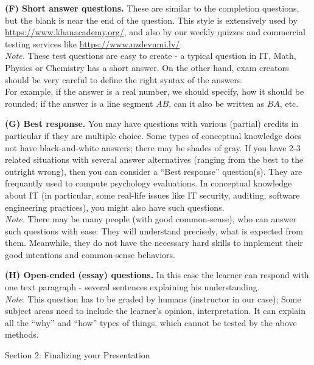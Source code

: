 \documentclass[jou]{apa6}
\begin{document}
\vspace{6pt}
{\bf (F) Short answer questions.} These are similar to the completion questions, but the blank is near
the end of the question. This style is extensively used by \url{https://www.khanacademy.org/}, and also 
by our weekly quizzes and commercial testing services like \url{https://www.uzdevumi.lv/}.\\
{\em Note.} These test questions are easy to create - a typical question in IT, Math, Physics or Chemistry has
a short answer. On the other hand, exam creators should be very careful to define the right syntax of the answers.\\
For example, if the answer is a real number, we should specify, how it should be rounded; 
if the answer is a line segment $AB$, can it also be written as $BA$, etc.


\vspace{6pt}
{\bf (G) Best response.} You may have questions with various (partial) credits \textendash{} in particular
if they are multiple choice. 
Some types of conceptual knowledge does not have black-and-white answers; there may be shades of gray. 
If you have 2-3 related situations with several answer alternatives (ranging from the best to the outright wrong), 
then you can consider a ``Best response'' question(s). They are frequantly used to compute psychology 
evaluations. In conceptual knowledge about IT (in particular, 
some real-life issues like IT security, auditing, software engineering practices), you might also have 
such questions.\\
{\em Note.} There may be many people (with good common-sense), who can answer
such questions with ease: They will understand precisely, what is expected from them. 
Meanwhile, they do not have the necessary hard skills to implement their good intentions and 
common-sense behaviors.


\vspace{6pt}
{\bf (H) Open-ended (essay) questions.} In this case the learner can respond with one text paragraph - several 
sentences explaining his understanding.\\ 
{\em Note.} This question has to be graded by humans (instructor in our case); Some subject areas need 
to include the learner's opinion, interpretation. It can explain all the ``why'' and ``how'' types of things, 
which cannot be tested by the above methods. 

\vspace{20pt}
{\large Section 2: Finalizing your Presentation}
\end{document}
